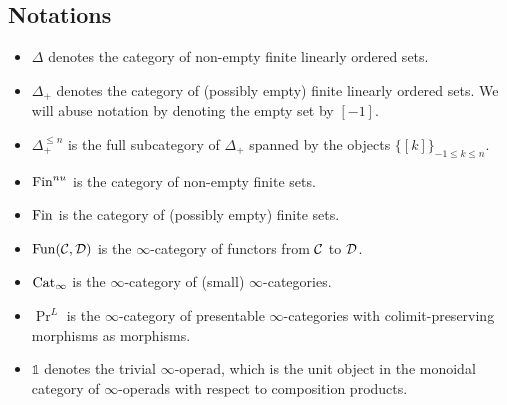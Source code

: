 \subsection{Notations}
\begin{itemize}
	\item $\Delta$ denotes the category of non-empty finite linearly ordered sets.
	\item $\Delta_{+}$ denotes the category of (possibly empty) finite linearly ordered sets. We will abuse notation by denoting the empty set by $[-1]$.
	\item $\Delta^{\leq n}_{+}$ is the full subcategory of $\Delta_{+}$ spanned by the objects $\{[k]\}_{-1\leq k\leq n}$.
	\item $\operatorname{Fin}^{nu}$ is the category of non-empty finite sets.
	\item $\operatorname{Fin}$ is the category of (possibly empty) finite sets. 
	\item $\operatorname{Fun}({\mathcal{C}},{\mathcal{D}})$ is the $\infty$-category of functors from ${\mathcal{C}}$ to ${\mathcal{D}}$.
	\item $\operatorname{Cat}_{\infty}$ is the $\infty$-category of (small) $\infty$-categories.
	\item $\Pr^{L}$ is the $\infty$-category of presentable $\infty$-categories with colimit-preserving morphisms as morphisms.
	\item $\mathds{1}$ denotes the trivial $\infty$-operad, which is the unit object in the monoidal category of $\infty$-operads with respect to composition products.
\end{itemize}